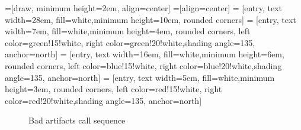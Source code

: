 
\usetikzlibrary{calc,positioning}
\usetikzlibrary{arrows.meta}

=[draw, minimum height=2em, align=center]
=[align=center]
 = [entry, text width=28em, fill=white,minimum height=10em, rounded corners]
 = [entry, text width=7em, fill=white,minimum height=4em, rounded corners, left color=green!15!white, right color=green!20!white,shading angle=135, anchor=north]
 = [entry, text width=16em, fill=white,minimum height=6em, rounded corners, left color=blue!15!white, right color=blue!20!white,shading angle=135, anchor=north]
 = [entry, text width=5em, fill=white,minimum height=3em, rounded corners, left color=red!15!white, right color=red!20!white,shading angle=135, anchor=north]
\def\blockdist{2.3}
\def\edgedist{2.5}

\begin{figure}
	\centering
{} 
\caption{Bad artifacts call sequence} 	\label{fig:artart}
\end{figure}